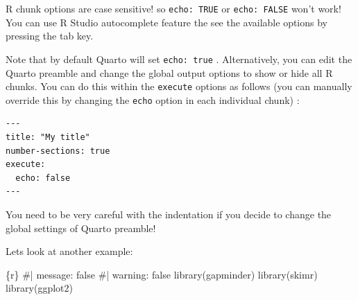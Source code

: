 \documentclass[
  letterpaper,
  DIV=11,
  numbers=noendperiod]{scrartcl}
\newenvironment{Shaded}{\begin{snugshade}}{\end{snugshade}}
\newcommand{\CommentTok}[1]{\textcolor[rgb]{0.37,0.37,0.37}{#1}}
\newcommand{\FunctionTok}[1]{\textcolor[rgb]{0.28,0.35,0.67}{#1}}
\newcommand{\InformationTok}[1]{\textcolor[rgb]{0.37,0.37,0.37}{#1}}
\newcommand{\NormalTok}[1]{\textcolor[rgb]{0.00,0.23,0.31}{#1}}
\begin{document}
\begin{tcolorbox}[enhanced jigsaw, colback=white, toprule=.15mm, arc=.35mm, colbacktitle=quarto-callout-important-color!10!white, titlerule=0mm, colframe=quarto-callout-important-color-frame, title=\textcolor{quarto-callout-important-color}{\faExclamation}\hspace{0.5em}{Important}, bottomtitle=1mm, toptitle=1mm, coltitle=black, rightrule=.15mm, opacityback=0, bottomrule=.15mm, breakable, leftrule=.75mm, left=2mm, opacitybacktitle=0.6]

R chunk options are case sensitive! so \texttt{echo:\ TRUE} or
\texttt{echo:\ FALSE} won't work! You can use R Studio autocomplete
feature the see the available options by pressing the tab key.

\end{tcolorbox}

Note that by default Quarto will set \texttt{echo:\ true} .
Alternatively, you can edit the Quarto preamble and change the global
output options to show or hide all R chunks. You can do this within the
\texttt{execute} options as follows (you can manually override this by
changing the \texttt{echo} option in each individual chunk) :

\begin{verbatim}
---
title: "My title"
number-sections: true
execute:
  echo: false
---
\end{verbatim}

\begin{tcolorbox}[enhanced jigsaw, colback=white, toprule=.15mm, arc=.35mm, colbacktitle=quarto-callout-important-color!10!white, titlerule=0mm, colframe=quarto-callout-important-color-frame, title=\textcolor{quarto-callout-important-color}{\faExclamation}\hspace{0.5em}{Important}, bottomtitle=1mm, toptitle=1mm, coltitle=black, rightrule=.15mm, opacityback=0, bottomrule=.15mm, breakable, leftrule=.75mm, left=2mm, opacitybacktitle=0.6]

You need to be very careful with the indentation if you decide to change
the global settings of Quarto preamble!

\end{tcolorbox}

Lets look at another example:

\begin{Shaded}
\begin{Highlighting}[]
\InformationTok{\textasciigrave{}\textasciigrave{}\textasciigrave{}\{r\}}
\CommentTok{\#| message: false}
\CommentTok{\#| warning: false}
\FunctionTok{library}\NormalTok{(gapminder)}
\FunctionTok{library}\NormalTok{(skimr)}
\FunctionTok{library}\NormalTok{(ggplot2)}
\InformationTok{\textasciigrave{}\textasciigrave{}\textasciigrave{}}
\end{Highlighting}
\end{Shaded}
\end{document}
